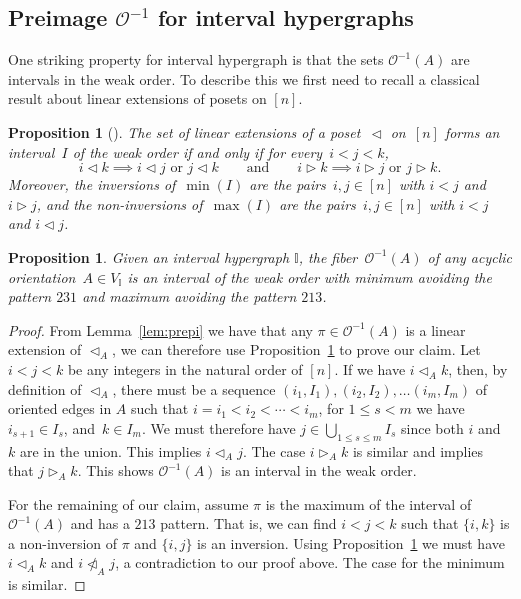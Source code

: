 \documentclass[reqno]{amsart}
\newtheorem{proposition}[theorem]{Proposition}
\theoremstyle{definition}
\newcommand{\less}{\vartriangleleft} %
\newcommand{\more}{\vartriangleright} %
\newcommand{\Or}{\mathcal O}  %
\newcommand{\II}{\mathbb I} %
\begin{document}

\subsection{Preimage $\Or^{-1}$ for interval hypergraphs} 
\label{subsec:preimageI}

One striking property for interval hypergraph is that  the sets  $\Or^{-1}(A)$ are intervals in the weak order.
To describe this we first need to recall a classical result about linear extensions of posets on $[n]$.

\begin{proposition}[{\cite[Thm.~6.8]{BjornerWachs}}]
\label{prop:WOIP}
The set of linear extensions of a poset~$\less$ on~$[n]$ forms an interval~$I$ of the weak order if and only if for every~$i < j < k$,
\[
i \less k \implies i \less j \text{ or } j \less k
\qquad\text{and}\qquad
i \more k \implies i \more j \text{ or } j \more k.
\]
Moreover, the inversions of~$\min(I)$ are the pairs~$i,j \in [n]$ with $i < j$ and $i \more j$, and the non-inversions of~$\max(I)$ are the pairs~$i,j \in [n]$ with $i < j$ and $i \less j$.
\end{proposition}

\begin{proposition}\label{prop:preimage}
Given an interval  hypergraph $\II$, the fiber~$\Or^{-1}(A)$ of any acyclic orientation~$A\in V_{\II}$ is an interval of the weak order with minimum avoiding the pattern $231$ and maximum avoiding the pattern $213$.
\end{proposition}

\begin{proof}
From Lemma~\ref{lem:prepi} we have that any $\pi\in \Or^{-1}(A)$  is a linear extension of $\less_A$, we can therefore use Proposition~\ref{prop:WOIP} to prove our claim. 
Let $i<j<k$ be any integers in the natural order of $[n]$. If we have $i\less_{A} k$, then, by definition of $\less_A$, there must be a sequence $(i_1,I_{1}), (i_2,I_{2}),\ldots (i_m,I_{m})$ of oriented edges in $A$ such that
$i=i_1<i_2<\cdots <i_{m}$, for $1\le s<m$ we have $i_{s+1}\in I_s$, and~$k\in I_m$. We must therefore have $j\in\bigcup_{1\le s\le m} I_s$ since both $i$ and $k$ are in the union. This implies $i\less_{A} j$. The case $i\more_{A} k$ is similar and  implies
that $j\more_A k$. This shows $\Or^{-1}(A)$ is an interval in the weak order.

For the remaining of our claim, assume $\pi$ is the maximum of the interval of $\Or^{-1}(A)$ and has a $213$ pattern. That is,  we can find $i<j<k$ such that $\{i,k\}$ is a non-inversion of $\pi$ and $\{i,j\}$ is an inversion. Using Proposition~\ref{prop:WOIP} we must have $i\less_A k$ and $i\not\less_A j$, a contradiction to our proof above. The case for the minimum is similar.
\end{proof}
\end{document}
